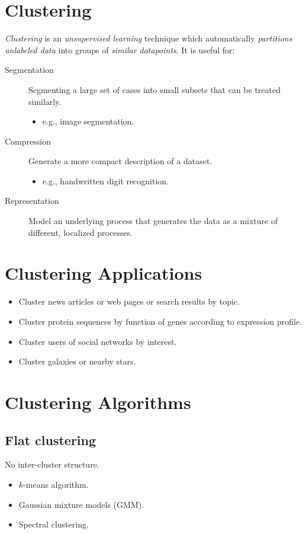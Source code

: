 \documentclass[
	number={6},
	title={Clustering}
]{cs584notes}
\begin{document}
\section{Clustering}\label{sec:clustering}
\emph{Clustering} is an \emph{unsupervised learning} technique which automatically \emph{partitions unlabeled data} into groups of \emph{similar datapoints}.
It is useful for:
\begin{description}
	\item[Segmentation] Segmenting a large set of cases into small subsets that can be treated similarly.
	\begin{itemize}
		\item e.g., image segmentation.
	\end{itemize}
	\item[Compression] Generate a more compact description of a dataset.
	\begin{itemize}
		\item e.g., handwritten digit recognition.
	\end{itemize}
	\item[Representation] Model an underlying process that generates the data as a mixture of different, localized processes.
\end{description}

\section{Clustering Applications}\label{sec:clustering-applications}
\begin{itemize}
	\item Cluster news articles or web pages or search results by topic.
	\item Cluster protein sequences by function of genes according to expression profile.
	\item Cluster users of social networks by interest.
	\item Cluster galaxies or nearby stars.
\end{itemize}

\section{Clustering Algorithms}\label{sec:clustering-algorithms}
\subsection{Flat clustering}\label{subsec:flat-clustering}
No inter-cluster structure.
\begin{itemize}
	\item $k$-means algorithm.
	\item Gaussian mixture models (GMM).
	\item Spectral clustering.
\end{itemize}
\end{document}
